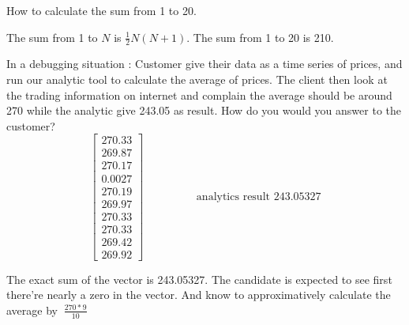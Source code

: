 \documentclass{exam}%
\begin{document}
\begin{questions}
\question How to calculate the sum from 1 to 20.
\begin{solution}[.2in]
	The sum from 1 to $N$ is $\frac{1}{2}N(N+1)$. The sum from 1 to 20 is 210.
\end{solution}

\question In a debugging situation : Customer give their data as a time series of prices, and run our analytic tool to calculate the average of prices. The client then look at the trading information on internet and complain the average should be around 270 while the analytic give 243.05 as result. How do you would you answer to the customer? 
\[
\left[ 
\begin{array}{c}
270.33 \\
269.87 \\
270.17 \\
0.0027 \\
270.19 \\
269.97 \\
270.33 \\
270.33 \\
269.42 \\
269.92
\end{array}
\right]
\hspace{2cm}
\text{analytics result 243.05327}
\]
\begin{solution}[.2in]
	The exact sum of the vector is 243.05327. The candidate is expected to see first there're nearly a zero in the vector. And know to approximatively calculate the average by $~ \frac{270*9}{10}$
\end{solution}


\end{questions}
\end{document}
